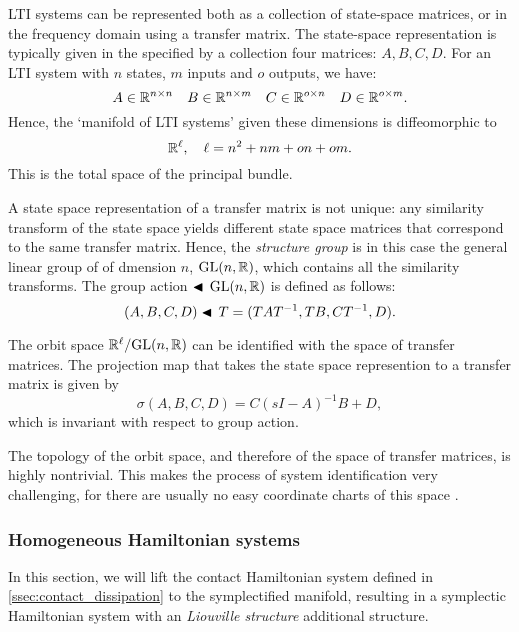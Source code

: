 LTI systems can be represented both as a collection of state-space matrices, or in the frequency domain using a transfer matrix. The state-space representation is typically given in the specified by a collection four matrices: \(A, B, C, D\). For an LTI system with \(n\) states, \(m\) inputs and \(o\) outputs, we have:
\begin{equation}
     A \in \mathbb{R}^{n \times n} \quad B \in \mathbb{R}^{n \times m} \quad C \in \mathbb{R}^{o \times n} \quad D \in \mathbb{R}^{o \times m}.
\end{equation}
Hence, the `manifold of LTI systems' given these dimensions is diffeomorphic to \cite{Verhaegen2007} \begin{equation}
     \mathbb{R}^{\ell}, \quad \ell = n^2 + nm + on + om.
\end{equation}  
This is the total space of the principal bundle.

A state space representation of a transfer matrix is not unique: any similarity transform of the state space yields different state space matrices that correspond to the same transfer matrix. Hence, the \emph{structure group} is in this case the general linear group of of dmension \(n\), \(\mathrm{GL}(n, \mathbb{R})\), which contains all the similarity transforms. The group action \(\blacktriangleleft\,\mathrm{GL}(n, \mathbb{R}) \) is defined as follows:
\begin{equation}
     (A, B, C, D) \blacktriangleleft\,T = (T A T^{-1}, TB, CT^{-1}, D).
\end{equation}

The orbit space \(\mathbb{R}^\ell/\mathrm{GL}(n, \mathbb{R})\) can be identified with the space of transfer matrices. The projection map that takes the state space represention to a transfer matrix is given by
\begin{equation}
     \sigma(A, B, C, D) = C(s I - A )^{-1} B + D,
\end{equation}
which is invariant with respect to group action.

The topology of the orbit space, and therefore of the space of transfer matrices, is highly nontrivial. This makes the process of system identification very challenging, for there are usually no easy coordinate charts of this space \cite{Verhaegen2007,Hermann1984}.

\subsubsection{Homogeneous Hamiltonian systems}
In this section, we will lift the contact Hamiltonian system defined in \cref{ssec:contact_dissipation} to the symplectified manifold, resulting in a symplectic Hamiltonian system with an \emph{Liouville structure} additional structure.

